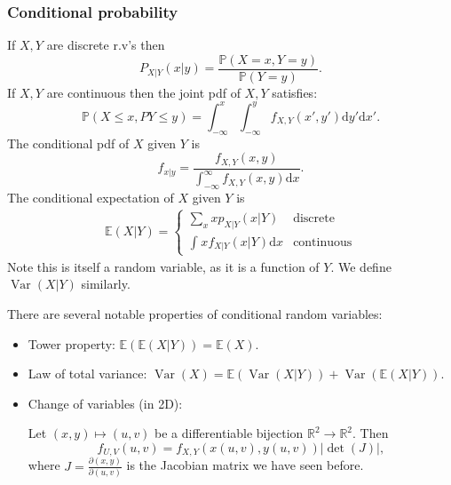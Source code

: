 \documentclass[a4paper]{scrartcl}
\begin{document}
\subsubsection*{Conditional probability}
\begin{definition*}
     If $X,Y$ are discrete r.v's then \[
     P_{X|Y}(x|y)= \frac{\mathbb{P}(X=x, Y=y)}{\mathbb{P}(Y=y)}
     .\]   
     If $X,Y$ are continuous then the joint pdf of $X,Y$ satisfies: \[
     \mathbb{P}(X \leq x, P Y \leq y)=\int_{- \infty}^{x}\int_{- \infty}^{y}f_{X,Y} (x',y')\mathrm{d}y'  \mathrm{d}x' 
     .\] 
     The conditional pdf of $X$ given $Y$ is \[
     f_{x|y}= \frac{f_{X,Y}(x,y)}{\int_{- \infty}^{ \infty}f_{X,Y}(x,y) \mathrm{d}x }
     .\] 
     The conditional expectation of $X$ given $Y$ is 
     \begin{align*}
          \mathbb{E}(X|Y)=
          \begin{cases}
               \sum_{x}^{}xp_{X|Y}(x|Y) & \text{discrete}\\
               \int_{}^{}x f_{X|Y}(x|Y) \mathrm{d}x & \text{continuous}
          \end{cases}
     \end{align*}
     Note this is itself a random variable, as it is a function of $Y$. We define $\operatorname{Var}(X|Y)$ similarly. 
\end{definition*}
There are several notable properties of conditional random variables:
\begin{itemize}
     \item Tower property: $\mathbb{E}(\mathbb{E}(X|Y))=\mathbb{E}(X)$.
     \item Law of total variance: $\operatorname{Var}(X)=\mathbb{E}(\operatorname{Var}(X|Y))+\operatorname{Var}(\mathbb{E}(X|Y))$. 
     \item Change of variables (in 2D):

     Let $(x,y) \mapsto (u,v)$ be a differentiable bijection $\mathbb{R}^{2} \rightarrow \mathbb{R}^{2} $. Then \[
     f_{U,V}(u,v)=f_{X,Y}(x (u,v),y (u,v))|\det (J)|
     ,\] where $J=\frac{\partial (x,y)}{\partial (u,v)}$ is the Jacobian matrix we have seen before. 
\end{itemize}
\end{document}
